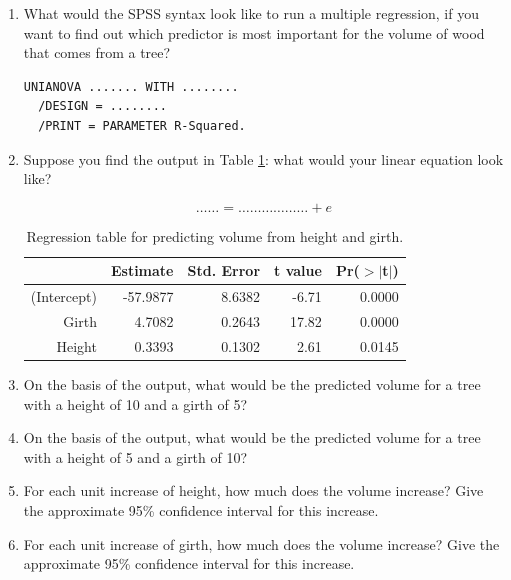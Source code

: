 \documentclass[]{book}\usepackage[]{graphicx}\usepackage[]{color}
\begin{document}
\begin{enumerate}
\item What would the SPSS syntax look like to run a multiple regression, if you want to find out which predictor is most important for the volume of wood that comes from a tree?


\begin{verbatim}
UNIANOVA ....... WITH ........
  /DESIGN = ........
  /PRINT = PARAMETER R-Squared.
\end{verbatim}


\item Suppose you find the output in Table \ref{tab:multi_5}: what would your linear equation look like?

\begin{equation}
\dots \dots = \dots    \dots   \dots \dots \dots \dots+ e
\end{equation}


\begin{table}[ht]
\centering
\caption{Regression table for predicting volume from height and girth.} 
\label{tab:multi_5}
\begin{tabular}{rrrrr}
  \hline
 & Estimate & Std. Error & t value & Pr($>$$|$t$|$) \\ 
  \hline
(Intercept) & -57.9877 & 8.6382 & -6.71 & 0.0000 \\ 
  Girth & 4.7082 & 0.2643 & 17.82 & 0.0000 \\ 
  Height & 0.3393 & 0.1302 & 2.61 & 0.0145 \\ 
   \hline
\end{tabular}
\end{table}





\item On the basis of the output, what would be the predicted volume for a tree with a height of 10 and a girth of 5?

\item On the basis of the output, what would be the predicted volume for a tree with a height of 5 and a girth of 10?

\item For each unit increase of height, how much does the volume increase? Give the approximate 95\% confidence interval for this increase.

\item For each unit increase of girth, how much does the volume increase? Give the approximate 95\% confidence interval for this increase.



\end{enumerate}
\end{document}
